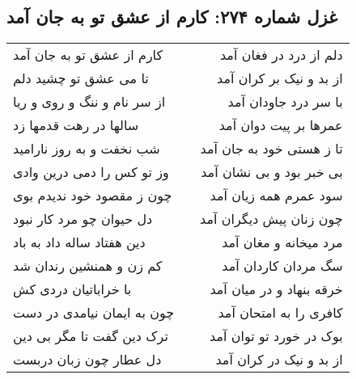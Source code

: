 \begin{center}
\section*{غزل شماره ۲۷۴: کارم از عشق تو به جان آمد}
\label{sec:274}
\begin{longtable}{l p{0.5cm} r}
کارم از عشق تو به جان آمد
&&
دلم از درد در فغان آمد
\\
تا می عشق تو چشید دلم
&&
از بد و نیک بر کران آمد
\\
از سر نام و ننگ و روی و ریا
&&
با سر درد جاودان آمد
\\
سالها در رهت قدمها زد
&&
عمرها بر پیت دوان آمد
\\
شب نخفت و به روز نارامید
&&
تا ز هستی خود به جان آمد
\\
وز تو کس را دمی درین وادی
&&
بی خبر بود و بی نشان آمد
\\
چون ز مقصود خود ندیدم بوی
&&
سود عمرم همه زیان آمد
\\
دل حیوان چو مرد کار نبود
&&
چون زنان پیش دیگران آمد
\\
دین هفتاد ساله داد به باد
&&
مرد میخانه و مغان آمد
\\
کم زن و همنشین رندان شد
&&
سگ مردان کاردان آمد
\\
با خراباتیان دردی کش
&&
خرقه بنهاد و در میان آمد
\\
چون به ایمان نیامدی در دست
&&
کافری را به امتحان آمد
\\
ترک دین گفت تا مگر بی دین
&&
بوک در خورد تو توان آمد
\\
دل عطار چون زبان دربست
&&
از بد و نیک در کران آمد
\\
\end{longtable}
\end{center}
